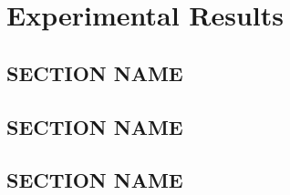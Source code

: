 \chapter{Experimental Results}


\section{SECTION NAME}
\lipsum[2]

\section{SECTION NAME}
\lipsum[3]

\section{SECTION NAME}
\lipsum[2]